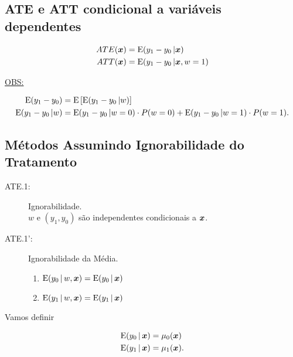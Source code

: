 \documentclass[11pt, oneside, a4paper, article]{article}
\numberwithin{equation}{section}
\begin{document}
\begin{description}
\subsection{ATE e ATT condicional a variáveis dependentes}

\vspace{-1 em}
\begin{align*}
ATE( \boldsymbol{x} ) &= \text{E}( y_1 - y_0 \, | \boldsymbol{x})
\\
ATT( \boldsymbol{x} ) &= \text{E}( y_1 - y_0 \, | \boldsymbol{x}, w = 1)
\end{align*}

\noindent
\underline{OBS:}

\vspace{-1 em}
\begin{align*}
\text{E}( y_1 - y_0 ) &= \text{E} \left[ \text{E}( y_1 - y_0 \, | w) \right]
\\
\text{E}( y_1 - y_0 \, | w ) &=
\text{E}( y_1 - y_0 \, | w = 0 ) \cdot P(w=0)
+
\text{E}( y_1 - y_0 \, | w = 1 ) \cdot P(w=1).
\end{align*}

\subsection{Métodos Assumindo Ignorabilidade do Tratamento}

\begin{description}
\item[ATE.1:] Ignorabilidade. 
\\
$w$ e $(y_{1}, y_{0})$ são independentes condicionais a $\boldsymbol{x}$.

\item[ATE.1':] Ignorabilidade da Média. 

\vspace{-.75 em}
\begin{enumerate}[label =\alph*)] \itemsep0pt
\item $\text{E}( y_{0} \, | \, w, \boldsymbol{x} ) = \text{E}( y_{0} \, | \, \boldsymbol{x} )$
\item $\text{E}( y_{1} \, | \, w, \boldsymbol{x} ) = \text{E}( y_{1} \, | \, \boldsymbol{x} )$
\end{enumerate}

\end{description}

Vamos definir

\vspace{-1 em}
\begin{align*}
	\text{E}( y_{0} \, | \, \boldsymbol{x} ) &= \mu_{0}( \boldsymbol{x} )
	\\
	\text{E}( y_{1} \, | \, \boldsymbol{x} ) &= \mu_{1}( \boldsymbol{x} ).
\end{align*}


\end{description}
\end{document}
